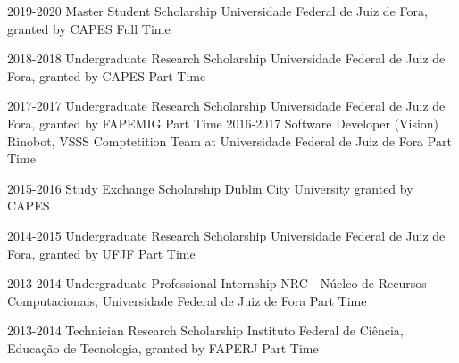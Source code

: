 

\begin{cvskills}

  \cvskill
    {2019-2020} %
    {Master Student Scholarship} %
    {Universidade Federal de Juiz de Fora, granted by CAPES} %
    {Full Time} %

  \cvskill
    {2018-2018} %
    {Undergraduate Research Scholarship} %
    {Universidade Federal de Juiz de Fora, granted by CAPES} %
    {Part Time} %

  \cvskill
    {2017-2017} %
    {Undergraduate Research Scholarship} %
    {Universidade Federal de Juiz de Fora, granted by FAPEMIG} %
    {Part Time} %
  \cvskill
    {2016-2017} %
    {Software Developer (Vision)} %
    {Rinobot, VSSS Comptetition Team at Universidade Federal de Juiz de Fora} %
    {Part Time} %

  \cvskill
    {2015-2016} %
    {Study Exchange Scholarship} %
    {Dublin City University} %
    {granted by CAPES}

  \cvskill
    {2014-2015} %
    {Undergraduate Research Scholarship} %
    {Universidade Federal de Juiz de Fora, granted by UFJF} %
    {Part Time} %

  \cvskill
    {2013-2014} %
    {Undergraduate Professional Internship} %
    {NRC - Núcleo de Recursos Computacionais, Universidade Federal de Juiz de Fora} %
    {Part Time} %

  \cvskill
    {2013-2014} %
    {Technician Research Scholarship} %
    {Instituto Federal de Ciência, Educação de Tecnologia, granted by FAPERJ} %
    {Part Time} %

\end{cvskills}
